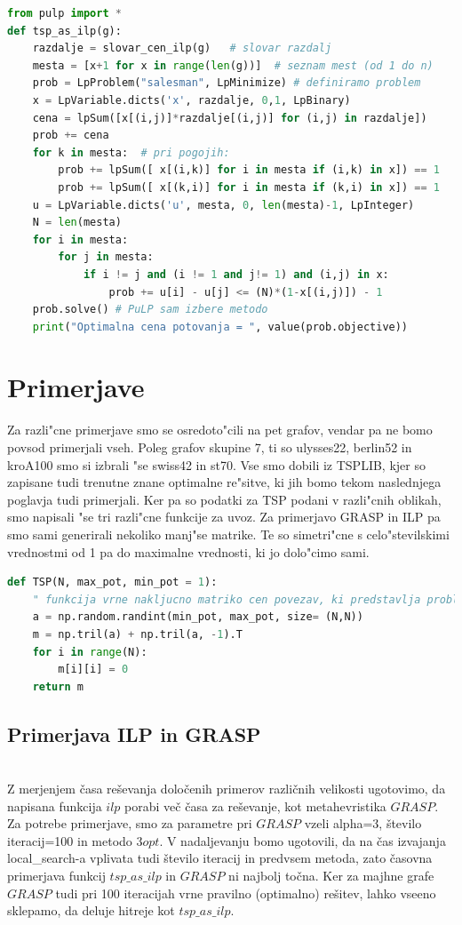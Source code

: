 \documentclass[12pt,a4paper]{amsart}
\theoremstyle{definition} %
\theoremstyle{plain} %
\begin{document}
\begin{lstlisting}[language=Python]
from pulp import *
def tsp_as_ilp(g):
    razdalje = slovar_cen_ilp(g)   # slovar razdalj 
    mesta = [x+1 for x in range(len(g))]  # seznam mest (od 1 do n)
    prob = LpProblem("salesman", LpMinimize) # definiramo problem
    x = LpVariable.dicts('x', razdalje, 0,1, LpBinary) 
    cena = lpSum([x[(i,j)]*razdalje[(i,j)] for (i,j) in razdalje]) 
    prob += cena
    for k in mesta:  # pri pogojih:
        prob += lpSum([ x[(i,k)] for i in mesta if (i,k) in x]) == 1  
        prob += lpSum([ x[(k,i)] for i in mesta if (k,i) in x]) == 1  
    u = LpVariable.dicts('u', mesta, 0, len(mesta)-1, LpInteger) 
    N = len(mesta)
    for i in mesta:  
        for j in mesta:
            if i != j and (i != 1 and j!= 1) and (i,j) in x:
                prob += u[i] - u[j] <= (N)*(1-x[(i,j)]) - 1
    prob.solve() # PuLP sam izbere metodo
    print("Optimalna cena potovanja = ", value(prob.objective))   
\end{lstlisting}



\section{Primerjave}
Za razli"cne primerjave smo se osredoto"cili na pet grafov, vendar pa ne bomo povsod primerjali vseh. Poleg grafov skupine 7, ti so ulysses22, berlin52 in kroA100 smo si izbrali "se swiss42 in st70. Vse smo dobili iz TSPLIB, kjer so zapisane tudi trenutne znane optimalne re"sitve, ki jih bomo tekom naslednjega poglavja tudi primerjali. Ker pa so podatki za TSP podani v razli"cnih oblikah, smo napisali "se tri razli"cne funkcije za uvoz. Za primerjavo GRASP in ILP pa smo sami generirali nekoliko manj"se matrike. Te so simetri"cne s celo"stevilskimi vrednostmi od 1 pa do maximalne vrednosti, ki jo dolo"cimo sami. 

\begin{lstlisting}[language=Python]
def TSP(N, max_pot, min_pot = 1):
    " funkcija vrne nakljucno matriko cen povezav, ki predstavlja problem potujocega trgovca"
    a = np.random.randint(min_pot, max_pot, size= (N,N))
    m = np.tril(a) + np.tril(a, -1).T
    for i in range(N):
        m[i][i] = 0
    return m
\end{lstlisting}

\subsection{Primerjava ILP in GRASP} ~\\
Z merjenjem časa reševanja določenih primerov različnih velikosti ugotovimo, da napisana funkcija $ilp$ porabi več časa za reševanje, kot metahevristika $GRASP$. Za potrebe primerjave, smo za parametre pri $GRASP$ vzeli alpha=3, število iteracij=100 in metodo $3opt$. 
V nadaljevanju bomo ugotovili, da na čas izvajanja local\_search-a vplivata tudi število iteracij in predvsem metoda, zato časovna primerjava funkcij $ tsp\_as\_ilp$ in $GRASP$ ni najbolj točna. Ker za majhne grafe $GRASP$ tudi pri 100 iteracijah vrne pravilno (optimalno) rešitev,
lahko vseeno sklepamo, da deluje hitreje kot $ tsp\_as\_ilp$. 
\end{document}
